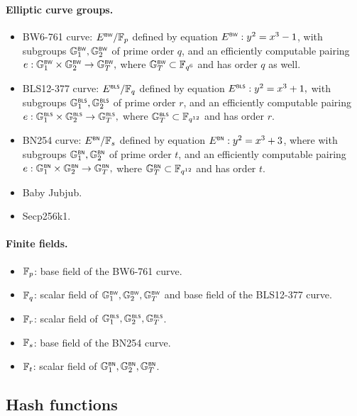 \paragraph{Elliptic curve groups.}
\begin{itemize}
	\item BW6-761 curve: $\BW{E}/\F_p$ defined by equation $\BW{E}: y^2 = x^3 - 1$, with subgroups $\BW{\G}_1, \BW{\G}_2$ of prime order $q$, and an efficiently computable pairing \({e}:\BW{\G}_1\times\BW{\G}_2 \rightarrow \BW{\G}_T,\) where $\BW{\G}_T \subset \F_{q^{6}}$ and has order $q$ as well. 
    \item BLS12-377 curve: $\BLS{E}/\F_q$ defined by equation \(\BLS{E}: y^2 = x^3 + 1,\) with subgroups $\BLS{\G}_1, \BLS{\G}_2$ of prime order $r$, and an efficiently computable pairing \({e}:\BLS{\G}_1\times\BLS{\G}_2 \rightarrow \BLS{\G}_T,\) where $\BLS{\G}_T \subset \F_{q^{12}}$ and has order $r$. 
    \item BN254 curve: $\BN{E}/\F_s$ defined by equation \( \BN{E}: y^2 = x^3 + 3\), where with subgroups $\BN{\G}_1, \BN{\G}_2$ of prime order $t$, and an efficiently computable pairing \(e:\BN{\G}_1\times\BN{\G}_2 \rightarrow \BN{\G}_T,\) where $\BN{\G}_T \subset \F_{q^{12}}$ and has order $t$. 
    \item Baby Jubjub.
    \item Secp256k1.
\end{itemize}

\paragraph{Finite fields.}
\begin{itemize}
	\item $\F_p$: base field of the BW6-761 curve.
	\item $\F_q$: scalar field of $\BW{\G}_1, \BW{\G}_2, \BW{\G}_T$ and base field of the BLS12-377 curve.
	\item $\F_r$: scalar field of $\BLS{\G}_1, \BLS{\G}_2, \BLS{\G}_T$.
	\item $\F_s$: base field of the BN254 curve.	
	\item $\F_t$: scalar field of $\BN{\G}_1, \BN{\G}_2, \BN{\G}_T$.
\end{itemize}


\subsection{Hash functions}
\label{sec:cryptographic-primitives:hash}

